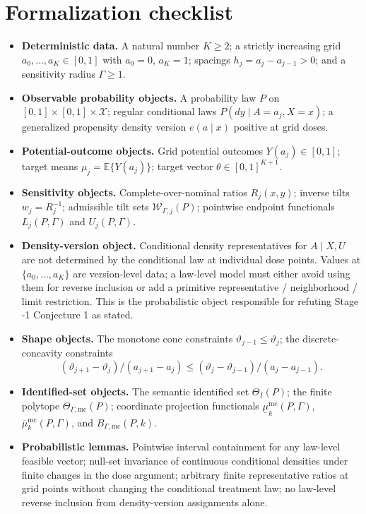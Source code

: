 \documentclass[11pt]{article}
\newcommand{\E}{\mathbb{E}}
\theoremstyle{definition}
\theoremstyle{plain}
\theoremstyle{remark}
\begin{document}
\section{Formalization checklist}
\begin{itemize}[leftmargin=2em]
\item \textbf{Deterministic data.}  A natural number \(K\ge2\); a strictly increasing grid \(a_0,\ldots,a_K\in[0,1]\) with \(a_0=0\), \(a_K=1\); spacings \(h_j=a_j-a_{j-1}>0\); and a sensitivity radius \(\Gamma\ge1\).
\item \textbf{Observable probability objects.}  A probability law \(P\) on \([0,1]\times[0,1]\times\mathcal X\); regular conditional laws \(P(dy\mid A=a_j,X=x)\); a generalized propensity density version \(e(a\mid x)\) positive at grid doses.
\item \textbf{Potential-outcome objects.}  Grid potential outcomes \(Y(a_j)\in[0,1]\); target means \(\mu_j=\E\{Y(a_j)\}\); target vector \(\theta\in[0,1]^{K+1}\).
\item \textbf{Sensitivity objects.}  Complete-over-nominal ratios \(R_j(x,y)\); inverse tilts \(w_j=R_j^{-1}\); admissible tilt sets \(\mathcal W_{\Gamma,j}(P)\); pointwise endpoint functionals \(L_j(P,\Gamma)\) and \(U_j(P,\Gamma)\).
\item \textbf{Density-version object.}  Conditional density representatives for \(A\mid X,U\) are not determined by the conditional law at individual dose points.  Values at \(\{a_0,\ldots,a_K\}\) are version-level data; a law-level model must either avoid using them for reverse inclusion or add a primitive representative / neighborhood / limit restriction.  This is the probabilistic object responsible for refuting Stage -1 Conjecture 1 as stated.
\item \textbf{Shape objects.}  The monotone cone constraints \(\vartheta_{j-1}\le\vartheta_j\); the discrete-concavity constraints
\[
(\vartheta_{j+1}-\vartheta_j)/(a_{j+1}-a_j)
\le
(\vartheta_j-\vartheta_{j-1})/(a_j-a_{j-1}).
\]
\item \textbf{Identified-set objects.}  The semantic identified set \(\Theta_I(P)\); the finite polytope \(\Theta_{\Gamma,\mathrm{mc}}(P)\); coordinate projection functionals \(\underline\mu^{\mathrm{mc}}_k(P,\Gamma)\), \(\overline\mu^{\mathrm{mc}}_k(P,\Gamma)\), and \(B_{\Gamma,\mathrm{mc}}(P,k)\).
\item \textbf{Probabilistic lemmas.}  Pointwise interval containment for any law-level feasible vector; null-set invariance of continuous conditional densities under finite changes in the dose argument; arbitrary finite representative ratios at grid points without changing the conditional treatment law; no law-level reverse inclusion from density-version assignments alone.

\end{itemize}
\end{document}
